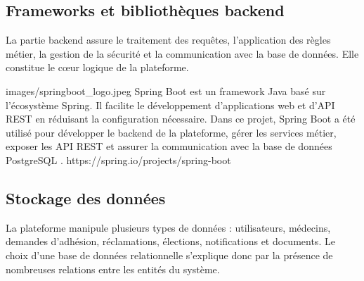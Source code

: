 ﻿\documentclass[12pt,a4paper]{report}
\begin{document}

\subsection{Frameworks et bibliothèques backend}

La partie backend assure le traitement des requêtes, l'application des règles
métier, la gestion de la sécurité et la communication avec la base de données.
Elle constitue le cœur logique de la plateforme.

\techno
{images/springboot_logo.jpeg}
{Spring Boot}
{est un framework Java basé sur l'écosystème Spring. Il facilite le
développement d'applications web et d'API REST en réduisant la configuration
nécessaire. Dans ce projet, Spring Boot a été utilisé pour développer le
backend de la plateforme, gérer les services métier, exposer les API REST et
assurer la communication avec la base de données PostgreSQL \cite{springBootDocs}.}
{https://spring.io/projects/spring-boot}


\subsection{Stockage des données}

La plateforme manipule plusieurs types de données : utilisateurs, médecins,
demandes d'adhésion, réclamations, élections, notifications et documents. Le
choix d'une base de données relationnelle s'explique donc par la présence de
nombreuses relations entre les entités du système.
\end{document}
